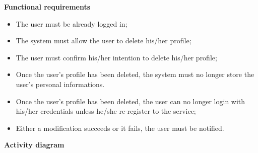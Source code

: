 \documentclass{article}
\begin{document}
	\bigskip
	\noindent
	\textbf{Functional requirements} \\
	\begin{itemize}
		\item The user must be already logged in;
		\item The system must allow the user to delete his/her profile;
		\item The user must confirm his/her intention to delete his/her profile;
		\item Once the user's profile has been deleted, the system must no longer store the user's personal informations.
		\item Once the user’s profile has been deleted, the user can no longer login with his/her credentials unless he/she re-register to the service;
		\item Either a modification succeeds or it fails, the user must be notified.
	\end{itemize}
	
	\newpage
	\noindent
	\textbf{Activity diagram} \\
	
\end{document}
